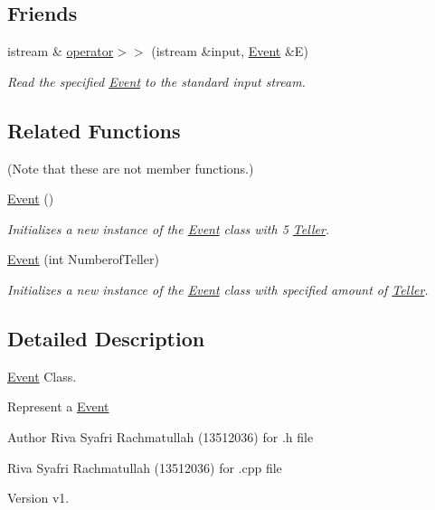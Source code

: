 \subsection*{Friends}
\begin{DoxyCompactItemize}
\item 
istream \& \hyperlink{class_event_aefab4a45e8de8a212980527a504d6061}{operator$>$$>$} (istream \&input, \hyperlink{class_event}{Event} \&E)
\begin{DoxyCompactList}\small\item\em Read the specified \hyperlink{class_event}{Event} to the standard input stream. \end{DoxyCompactList}\end{DoxyCompactItemize}
\subsection*{Related Functions}
(Note that these are not member functions.) \begin{DoxyCompactItemize}
\item 
\hyperlink{class_event_a5a40dd4708297f7031e29b39e039ae10}{Event} ()
\begin{DoxyCompactList}\small\item\em Initializes a new instance of the \hyperlink{class_event}{Event} class with 5 \hyperlink{class_teller}{Teller}. \end{DoxyCompactList}\item 
\hyperlink{class_event_a0cb91170821c7766ba1a142f80c1816e}{Event} (int Numberof\-Teller)
\begin{DoxyCompactList}\small\item\em Initializes a new instance of the \hyperlink{class_event}{Event} class with specified amount of \hyperlink{class_teller}{Teller}. \end{DoxyCompactList}\end{DoxyCompactItemize}


\subsection{Detailed Description}
\hyperlink{class_event}{Event} Class. 

Represent a \hyperlink{class_event}{Event}

\begin{DoxyAuthor}{Author}
Riva Syafri Rachmatullah (13512036) for .h file 

Riva Syafri Rachmatullah (13512036) for .cpp file
\end{DoxyAuthor}
\begin{DoxyVersion}{Version}
v1. 
\end{DoxyVersion}


